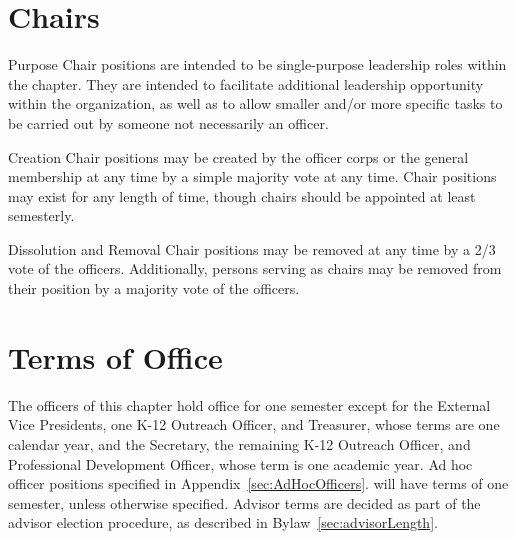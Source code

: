 \section{Chairs}
\begin{enumsubsection}
\item{Purpose} Chair positions are intended to be single-purpose leadership roles within the chapter. They are intended to facilitate additional leadership opportunity within the organization, as well as to allow smaller and/or more specific tasks to be carried out by someone not necessarily an officer.
\item{Creation} Chair positions may be created by the officer corps or the general membership at any time by a simple majority vote at any time. Chair positions may exist for any length of time, though chairs should be appointed at least semesterly.
\item{Dissolution and Removal} Chair positions may be removed at any time by a 2/3 vote of the officers. Additionally, persons serving as chairs may be removed from their position by a majority vote of the officers.
\end{enumsubsection}

\section{Terms of Office} The officers of this chapter hold office for one semester except for the External Vice Presidents, 
one K-12 Outreach Officer, and Treasurer, whose terms are one calendar year, and the Secretary, the remaining K-12 Outreach 
Officer, and Professional Development Officer, whose term is one academic year. Ad hoc officer positions specified in Appendix~\ref{sec:AdHocOfficers}. will have terms of one semester, unless otherwise specified. Advisor terms are decided as part of the advisor election procedure, as described in Bylaw~\ref{sec:advisorLength}.
